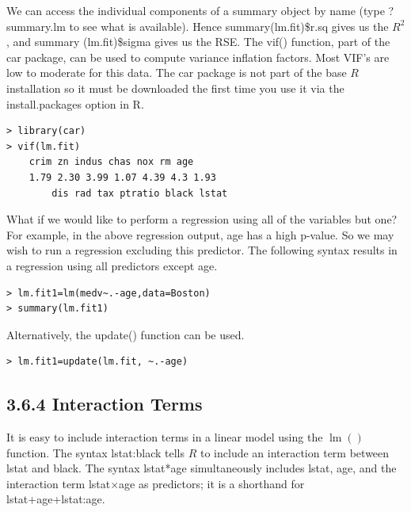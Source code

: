 \documentclass[10pt]{article}
\begin{document}
We can access the individual components of a summary object by name (type ?summary.lm to see what is available). Hence summary(lm.fit)\$r.sq gives us the $R^{2}$, and summary (lm.fit)\$sigma gives us the RSE. The vif() function, part of the car package, can be used to compute variance inflation factors. Most VIF's are low to moderate for this data. The car package is not part of the base $R$ installation so it must be downloaded the first time you use it via the install.packages option in R.

\begin{verbatim}
> library(car)
> vif(lm.fit)
    crim zn indus chas nox rm age
    1.79 2.30 3.99 1.07 4.39 4.3 1.93 
        dis rad tax ptratio black lstat
\end{verbatim}

What if we would like to perform a regression using all of the variables but one? For example, in the above regression output, age has a high p-value. So we may wish to run a regression excluding this predictor. The following syntax results in a regression using all predictors except age.

\begin{verbatim}
> lm.fit1=lm(medv~.-age,data=Boston)
> summary(lm.fit1)
\end{verbatim}

Alternatively, the update() function can be used.

\begin{verbatim}
> lm.fit1=update(lm.fit, ~.-age)
\end{verbatim}

\subsection*{3.6.4 Interaction Terms}
It is easy to include interaction terms in a linear model using the $\operatorname{lm}()$ function. The syntax lstat:black tells $R$ to include an interaction term between lstat and black. The syntax lstat*age simultaneously includes lstat, age, and the interaction term lstat×age as predictors; it is a shorthand for lstat+age+lstat:age.
\end{document}
